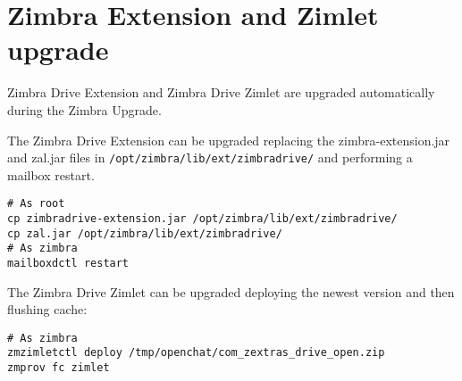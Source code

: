 \section{Zimbra Extension and Zimlet upgrade}
\begin{warning}
Zimbra Drive Extension and Zimbra Drive Zimlet are upgraded automatically during the Zimbra Upgrade.
\end{warning}

    
The Zimbra Drive Extension can be upgraded replacing the zimbra-extension.jar and zal.jar files in \texttt{/opt/zimbra/lib/ext/zimbradrive/} and performing a mailbox restart.
\begin{verbatim}
# As root
cp zimbradrive-extension.jar /opt/zimbra/lib/ext/zimbradrive/
cp zal.jar /opt/zimbra/lib/ext/zimbradrive/
# As zimbra
mailboxdctl restart
\end{verbatim}

The Zimbra Drive Zimlet can be upgraded deploying the newest version and then flushing cache:
\begin{verbatim}
# As zimbra
zmzimletctl deploy /tmp/openchat/com_zextras_drive_open.zip
zmprov fc zimlet
\end{verbatim}
